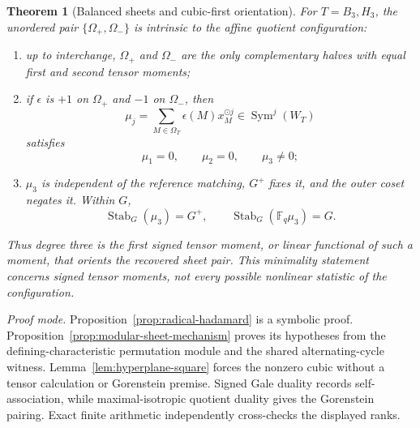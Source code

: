 \documentclass[11pt]{article}
\newtheorem{theorem}{Theorem}[section]
\theoremstyle{definition}
\theoremstyle{remark}
\newcommand{\F}{\mathbb{F}}
\begin{document}
\begin{theorem}[Balanced sheets and cubic-first orientation]
\label{thm:balanced-cubic}
For \(T=B_3,H_3\), the unordered pair
\(\{\Omega_+,\Omega_-\}\) is intrinsic to the affine quotient
configuration:
\begin{enumerate}[label=\textup{(\roman*)},leftmargin=*]
\item up to interchange, \(\Omega_+\) and \(\Omega_-\) are the only
complementary halves with equal first and second tensor moments;
\item if \(\epsilon\) is \(+1\) on \(\Omega_+\) and \(-1\) on
\(\Omega_-\), then
\[
 \mu_j=\sum_{M\in\Omega_T}\epsilon(M)x_M^{\odot j}
       \in\operatorname{Sym}^j(W_T)
\]
satisfies
\[
 \mu_1=0,\qquad \mu_2=0,\qquad \mu_3\ne0;                    \tag{4.5}
\]
\item \(\mu_3\) is independent of the reference matching,
\(G^+\) fixes it, and the outer coset negates it.  Within \(G\),
\[
 \operatorname{Stab}_G(\mu_3)=G^+,\qquad
 \operatorname{Stab}_G(\F_q\mu_3)=G.                         \tag{4.6}
\]
\end{enumerate}
Thus degree three is the first signed tensor moment, or linear
functional of such a moment, that orients the recovered sheet pair.
This minimality statement concerns signed tensor moments, not every
possible nonlinear statistic of the configuration.
\end{theorem}

\noindent\emph{Proof mode.}
Proposition~\ref{prop:radical-hadamard} is a symbolic proof.
Proposition~\ref{prop:modular-sheet-mechanism} proves its hypotheses from
the defining-characteristic permutation module and the shared
alternating-cycle witness.  Lemma~\ref{lem:hyperplane-square} forces the
nonzero cubic without a tensor calculation or Gorenstein premise.  Signed
Gale duality records self-association, while maximal-isotropic quotient
duality gives the Gorenstein pairing.  Exact finite arithmetic
independently cross-checks the displayed ranks.
\end{document}
